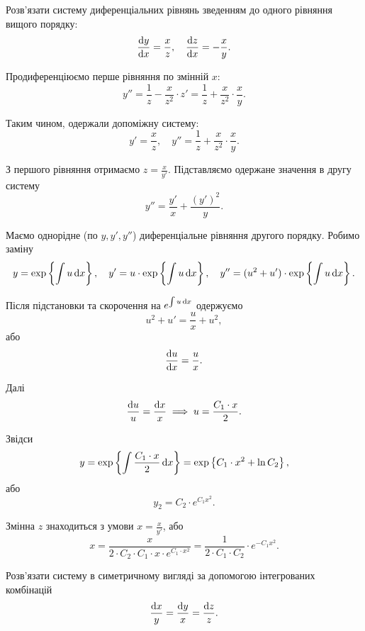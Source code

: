 \begin{example}
	Розв’язати систему диференціальних рівнянь зведенням до одного рівняння вищого порядку: \[ \frac{\mathop{}\!\mathrm{d} y}{\mathop{}\!\mathrm{d} x} = \frac{x}{z}, \quad \frac{\mathop{}\!\mathrm{d} z}{\mathop{}\!\mathrm{d} x} = -\frac{x}{y}.\]
\end{example}

\begin{solution}
	Продиференціюємо перше рівняння по змінній $x$:
	\[ y'' = \frac{1}{z} - \frac{x}{z^2} \cdot z' = \frac{1}{z} + \frac{x}{z^2} \cdot \frac{x}{y}. \]
	
	Таким чином, одержали допоміжну систему:
	\[ y' = \frac{x}{z}, \quad y'' = \frac{1}{z} + \frac{x}{z^2} \cdot \frac{x}{y}. \]

	З першого рівняння отримаємо $z = \frac{x}{y'}$. Підставляємо одержане значення в другу систему \[ y'' = \frac{y'}{x} + \frac{(y')^2}{y}.\]

	Маємо однорідне (по $y, y', y''$) диференціальне рівняння другого порядку. Робимо заміну \[y = \exp\left\{\int u \mathop{}\!\mathrm{d} x\right\}, \quad y' = u \cdot \exp\left\{\int u \mathop{}\!\mathrm{d} x\right\}, \quad y'' = (u^2 + u') \cdot \exp\left\{\int u \mathop{}\!\mathrm{d} x\right\}. \]

	Після підстановки та скорочення на $e^{\int u \mathop{}\!\mathrm{d} x}$ одержуємо \[ u^2 + u' = \frac{u}{x} + u^2, \] або \[ \frac{\mathop{}\!\mathrm{d} u}{\mathop{}\!\mathrm{d} x} = \frac{u}{x}. \]

	Далі \[ \frac{\mathop{}\!\mathrm{d} u}{u} = \frac{\mathop{}\!\mathrm{d} x}{x} \implies u = \frac{C_1 \cdot x}{2}. \]

	Звідси \[ y = \exp\left\{\int \frac{C_1 \cdot x}{2} \mathop{}\!\mathrm{d} x\right\} = \exp\left\{C_1 \cdot x^2 + \ln C_2\right\}, \] або \[ y_2 = C_2 \cdot e^{C_1 x^2}. \]

	Змінна $z$ знаходиться з умови $x = \frac{x}{y'}$, або \[ x = \frac{x}{2 \cdot C_2 \cdot C_1  \cdot x \cdot e^{C_1 \cdot x^2}} = \frac{1}{2 \cdot C_1 \cdot C_2} \cdot e^{- C_1 x^2}. \]
\end{solution}

\begin{example}
	Розв'язати систему в симетричному вигляді за допомогою інтегрованих комбінацій \[\frac{\mathop{}\!\mathrm{d} x}{y} = \frac{\mathop{}\!\mathrm{d} y}{x} = \frac{\mathop{}\!\mathrm{d} z}{z}.\]
\end{example}

